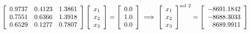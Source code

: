 $$\left[
\begin{array}{ccc}
0.9737 & 0.4123 & 1.3861 \\
0.7551 & 0.6366 & 1.3918 \\
0.6529 & 0.1277 & 0.7807 \\
\end{array}
\right] \left[
\begin{array}{c}
x_1\\x_2\\x_3
\end{array}
\right] = \left[
\begin{array}{c}
0.0\\
1.0 \\
0.0\\
\end{array}
\right] \implies \left[
\begin{array}{c}
x_1\\x_2\\x_3
\end{array}
\right]^{\rm sol~2}= \left[
\begin{array}{r}
-8691.1842 \\
-8688.3033 \\
8689.9911 \\
\end{array}
\right]$$

